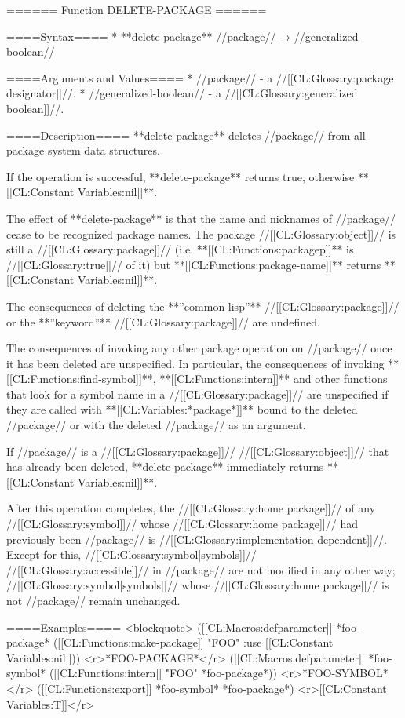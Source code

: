 ====== Function DELETE-PACKAGE ======

====Syntax====
  * **delete-package** //package// → //generalized-boolean//

====Arguments and Values====
  * //package// - a //[[CL:Glossary:package designator]]//.
  * //generalized-boolean// - a //[[CL:Glossary:generalized boolean]]//.

====Description====
**delete-package** deletes //package// from all package system data structures.

If the operation is successful, **delete-package** returns true, otherwise **[[CL:Constant Variables:nil]]**.

The effect of **delete-package** is that the name and nicknames of //package// cease to be recognized package names. The package //[[CL:Glossary:object]]// is still a //[[CL:Glossary:package]]// (i.e. **[[CL:Functions:packagep]]** is //[[CL:Glossary:true]]// of it) but **[[CL:Functions:package-name]]** returns **[[CL:Constant Variables:nil]]**.

The consequences of deleting the **''common-lisp''** //[[CL:Glossary:package]]// or the **''keyword''** //[[CL:Glossary:package]]// are undefined.

The consequences of invoking any other package operation on //package// once it has been deleted are unspecified. In particular, the consequences of invoking **[[CL:Functions:find-symbol]]**, **[[CL:Functions:intern]]** and other functions that look for a symbol name in a //[[CL:Glossary:package]]// are unspecified if they are called with **[[CL:Variables:*package*]]** bound to the deleted //package// or with the deleted //package// as an argument.

If //package// is a //[[CL:Glossary:package]]// //[[CL:Glossary:object]]// that has already been deleted, **delete-package** immediately returns **[[CL:Constant Variables:nil]]**.

After this operation completes, the //[[CL:Glossary:home package]]// of any //[[CL:Glossary:symbol]]// whose //[[CL:Glossary:home package]]// had previously been //package// is //[[CL:Glossary:implementation-dependent]]//. Except for this, //[[CL:Glossary:symbol|symbols]]// //[[CL:Glossary:accessible]]// in //package// are not modified in any other way; //[[CL:Glossary:symbol|symbols]]// whose //[[CL:Glossary:home package]]// is not //package// remain unchanged.

====Examples====
<blockquote>
([[CL:Macros:defparameter]] *foo-package* ([[CL:Functions:make-package]] "FOO" :use [[CL:Constant Variables:nil]])) <r>*FOO-PACKAGE*</r>
([[CL:Macros:defparameter]] *foo-symbol* ([[CL:Functions:intern]] "FOO" *foo-package*)) <r>*FOO-SYMBOL*</r>
([[CL:Functions:export]] *foo-symbol* *foo-package*) <r>[[CL:Constant Variables:T]]</r>

